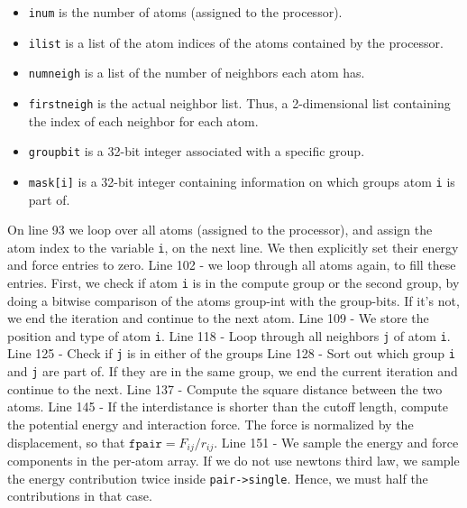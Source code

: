 \documentclass[twoside,english]{uiofysmaster}
\begin{document}
\begin{itemize}
\item[] \texttt{inum} is the number of atoms (assigned to the processor).

\item[] \texttt{ilist} is a list of the atom indices of the atoms contained by the processor.

\item[] \texttt{numneigh} is a list of the number of neighbors each atom has.

\item[] \texttt{firstneigh} is the actual neighbor list. Thus, a 2-dimensional list containing the index of each neighbor for each atom.

\item[] \texttt{groupbit} is a 32-bit integer associated with a specific group. 

\item[] \texttt{mask[i]} is a 32-bit integer containing information on which groups atom \texttt{i} is part of.  
\end{itemize}
On line 93 we loop over all atoms (assigned to the processor), and assign the atom index to the variable \texttt{i}, on the next line. 
We then explicitly set their energy and force entries to zero. 
Line 102 - we loop through all atoms again, to fill these entries. 
First, we check if atom \texttt{i} is in the compute group or the second group, by doing a bitwise comparison of the atoms group-int with the group-bits. If it's not, we end the iteration and continue to the next atom.
Line 109 - We store the position and type of atom \texttt{i}.
Line 118 - Loop through all neighbors \texttt{j} of atom \texttt{i}.
Line 125 - Check if \texttt{j} is in either of the groups
Line 128 - Sort out which group \texttt{i} and \texttt{j} are part of. 
If they are in the same group, we end the current iteration and continue to the next.
Line 137 - Compute the square distance between the two atoms.
Line 145 - If the interdistance is shorter than the cutoff length, compute the potential energy and interaction force. 
The force is normalized by the displacement,  so that $\texttt{fpair}=F_{ij}/r_{ij}$.
Line 151 - We sample the energy and force components in the per-atom array. 
If we do not use newtons third law, we sample the energy contribution twice inside \texttt{pair->single}. Hence, we must half the contributions in that case.
\end{document}
